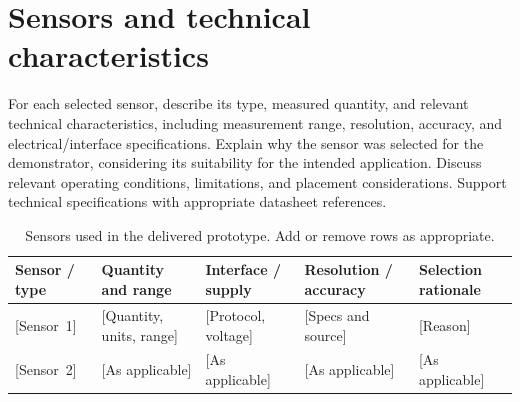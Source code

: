 \chapter{Sensors and technical characteristics}
\label{sec:sensors}

For each selected sensor, describe its type, measured quantity, and relevant
technical characteristics, including measurement range, resolution, accuracy,
and electrical/interface specifications. Explain why the sensor was selected
for the demonstrator, considering its suitability for the intended application.
Discuss relevant operating conditions, limitations, and placement
considerations. Support technical specifications with appropriate datasheet
references.

\begin{table}[htbp]
  \centering
  \caption{Sensors used in the delivered prototype. Add or remove rows as
  appropriate.}
  \label{tab:sensors}
  \begin{tabularx}{\linewidth}{YYYYY}
    \toprule
    Sensor / type & Quantity and range & Interface / supply &
    Resolution / accuracy & Selection rationale \\
    \midrule
    \mbox{[Sensor 1]} & [Quantity, units, range] & [Protocol, voltage] &
    [Specs and source] & [Reason] \\
    \mbox{[Sensor 2]} & [As applicable] & [As applicable] &
    [As applicable] & [As applicable] \\
    \bottomrule
  \end{tabularx}
\end{table}
